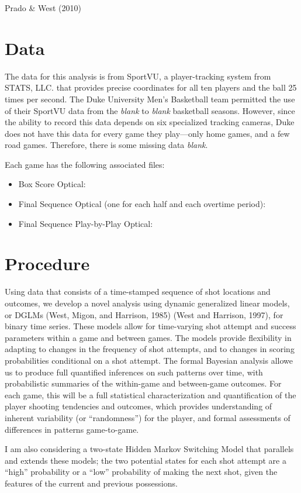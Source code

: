 \documentclass[12pt,twoside]{dukestatscithesis}
\theoremstyle{definition}
\theoremstyle{definition}
\theoremstyle{definition}
\theoremstyle{remark}
\begin{document}
Prado \& West (2010)

\chapter{Data}\label{data}

The data for this analysis is from SportVU, a player-tracking system
from STATS, LLC. that provides precise coordinates for all ten players
and the ball 25 times per second. The Duke University Men's Basketball
team permitted the use of their SportVU data from the \emph{blank} to
\emph{blank} basketball seasons. However, since the ability to record
this data depends on six specialized tracking cameras, Duke does not
have this data for every game they play---only home games, and a few
road games. Therefore, there is some missing data \emph{blank}.

Each game has the following associated files:
\begin{itemize}
\item
  Box Score Optical:
\item
  Final Sequence Optical (one for each half and each overtime period):
\item
  Final Sequence Play-by-Play Optical:
\end{itemize}
\chapter{Procedure}\label{proc}

Using data that consists of a time-stamped sequence of shot locations
and outcomes, we develop a novel analysis using dynamic generalized
linear models, or DGLMs (West, Migon, and Harrison, 1985) (West and
Harrison, 1997), for binary time series. These models allow for
time-varying shot attempt and success parameters within a game and
between games. The models provide flexibility in adapting to changes in
the frequency of shot attempts, and to changes in scoring probabilities
conditional on a shot attempt. The formal Bayesian analysis allowe us to
produce full quantified inferences on such patterns over time, with
probabilistic summaries of the within-game and between-game outcomes.
For each game, this will be a full statistical characterization and
quantification of the player shooting tendencies and outcomes, which
provides understanding of inherent variability (or ``randomness'') for
the player, and formal assessments of differences in patterns
game-to-game.

I am also considering a two-state Hidden Markov Switching Model that
parallels and extends these models; the two potential states for each
shot attempt are a ``high'' probability or a ``low'' probability of
making the next shot, given the features of the current and previous
possessions.
\end{document}
